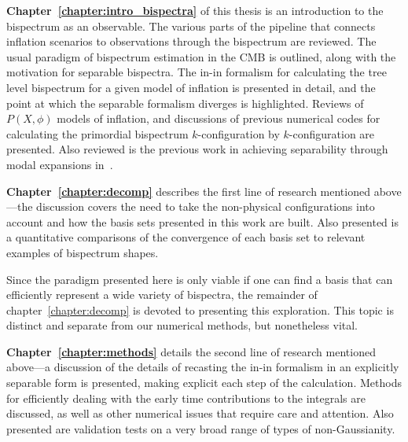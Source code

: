 \textbf{Chapter~\ref{chapter:intro_bispectra}} of this thesis
is an introduction to the bispectrum as an observable.
The various parts of the pipeline that connects inflation scenarios to observations
through the bispectrum are reviewed.
The usual paradigm of bispectrum estimation in the CMB is outlined,
along with the motivation for separable bispectra. The in-in formalism
for calculating the tree level bispectrum for a given model of inflation
is presented in detail, and the point at which the separable formalism diverges is
highlighted.
Reviews of $P(X,\phi)$ models of inflation, and
discussions of previous numerical codes for
calculating the primordial bispectrum $k$-configuration by $k$-configuration
are presented.
Also reviewed is the previous work in achieving separability through modal expansions
in~\cite{Funakoshi}.



\textbf{Chapter~\ref{chapter:decomp}} describes the first line of research mentioned above---the
discussion covers the need to
take the non-physical configurations into account and how the basis sets
presented in this work are built.
Also presented is a quantitative comparisons of the convergence of each basis set to
relevant examples of bispectrum shapes.


Since the paradigm presented here is only viable if one can find a basis
that can efficiently represent a wide variety of bispectra,
the remainder of chapter~\ref{chapter:decomp} is devoted to presenting this exploration.
This topic is distinct and separate from our numerical methods, but nonetheless vital.



\textbf{Chapter~\ref{chapter:methods}} details the second line of research mentioned above---a
discussion of the details of recasting the in-in formalism in an explicitly separable form is presented,
making explicit each step of the calculation.
Methods for efficiently dealing with the early time contributions to the integrals are discussed,
as well as other numerical issues that require care and attention.
Also presented are validation tests on a very broad range of types of non-Gaussianity.


